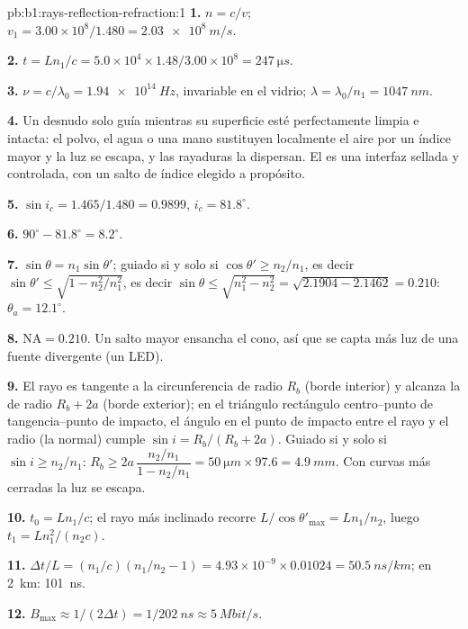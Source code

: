 \begin{solution}{pb:b1:rays-reflection-refraction:1}
\textbf{1.} $n = c/v$; $v_1 = 3.00\times10^8/1.480 = \qty{2.03e8}{m/s}$.

\textbf{2.} $t = Ln_1/c = 5.0\times10^4 \times 1.48/3.00\times10^8 =
\qty{247}{\micro s}$.

\textbf{3.} $\nu = c/\lambda_0 = \qty{1.94e14}{Hz}$, invariable en el vidrio;
$\lambda = \lambda_0/n_1 = \qty{1047}{nm}$.

\textbf{4.} Un  desnudo solo guía mientras su superficie esté
perfectamente limpia e intacta: el polvo, el agua o una mano sustituyen
localmente el aire por un índice mayor y la luz se escapa, y las rayaduras
la dispersan. El  es una interfaz sellada y controlada, con
un salto de índice elegido a propósito.

\textbf{5.} $\sin i_c = 1.465/1.480 = 0.9899$, $i_c = 81.8^\circ$.

\textbf{6.} $90^\circ - 81.8^\circ = 8.2^\circ$.

\textbf{7.} $\sin\theta = n_1\sin\theta'$; guiado si y solo si $\cos\theta' \geq
n_2/n_1$, es decir $\sin\theta' \leq \sqrt{1 - n_2^2/n_1^2}$,
es decir $\sin\theta \leq \sqrt{n_1^2 - n_2^2} = \sqrt{2.1904 - 2.1462} = 0.210$:
$\theta_a = 12.1^\circ$.

\textbf{8.} $\mathrm{NA} = 0.210$. Un salto mayor ensancha el cono, así
que se capta más luz de una fuente divergente (un LED).

\textbf{9.} El rayo es tangente a la circunferencia de radio $R_b$ (borde
interior) y alcanza la de radio $R_b + 2a$ (borde exterior); en el
triángulo rectángulo centro--punto de tangencia--punto de impacto, el
ángulo en el punto de impacto entre el rayo y el radio (la normal) cumple
$\sin i = R_b/(R_b + 2a)$. Guiado si y solo si $\sin i \geq n_2/n_1$:
$R_b \geq 2a\,\dfrac{n_2/n_1}{1 - n_2/n_1} = \qty{50}{\micro m} \times 97.6
= \qty{4.9}{mm}$. Con curvas más cerradas la luz se escapa.

\textbf{10.} $t_0 = Ln_1/c$; el rayo más inclinado recorre $L/\cos\theta'_{\max} =
Ln_1/n_2$, luego $t_1 = Ln_1^2/(n_2 c)$.

\textbf{11.} $\Delta t/L = (n_1/c)(n_1/n_2 - 1) = 4.93\times10^{-9} \times
0.01024 = \qty{50.5}{ns/km}$; en \qty{2}{km}: \qty{101}{ns}.

\textbf{12.} $B_{\max} \approx 1/(2\Delta t) = 1/\qty{202}{ns} \approx
\qty{5}{Mbit/s}$.


\end{solution}
